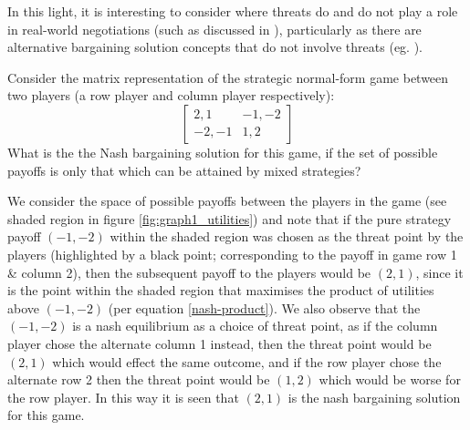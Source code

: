 In this light, it is interesting to consider where threats do and do not play a role in real-world negotiations (such as discussed in \cite{anbarci2002comparing}), particularly as there are alternative bargaining solution concepts that do not involve threats (eg. \cite{bozbay}). 


\begin{example}
Consider the matrix representation of the strategic normal-form game between two players (a row player and column player respectively):
\begin{equation}\label{eq:example_game1} \begin{bmatrix}2,1 & -1,-2\\ -2,-1 & 1,2\end{bmatrix} \end{equation}
What is the the Nash bargaining solution for this game, if the set of possible payoffs is only that which can be attained by mixed strategies?\end{example}
\begin{solution}
We consider the space of possible payoffs between the players in the game (see shaded region in figure \ref{fig:graph1_utilities})
and note that if the pure strategy payoff $(-1,-2)$ within the shaded region was chosen as the threat point by the players (highlighted by a black point; corresponding to the payoff in game row 1 \& column 2), then the subsequent payoff to the players would be $(2,1)$, since it is the point within the shaded region that maximises the product of utilities above $(-1,-2)$ (per equation \ref{nash-product}).
We also observe that the $(-1,-2)$ is a nash equilibrium as a choice of threat point, as if the column player chose the alternate column 1 instead, then the threat point would be $(2,1)$ which would effect the same outcome, and if the row player chose the alternate row 2 then the threat point would be $(1,2)$ which would be worse for the row player.
In this way it is seen that $(2,1)$ is the nash bargaining solution for this game.
\end{solution}
\vspace{2mm}

